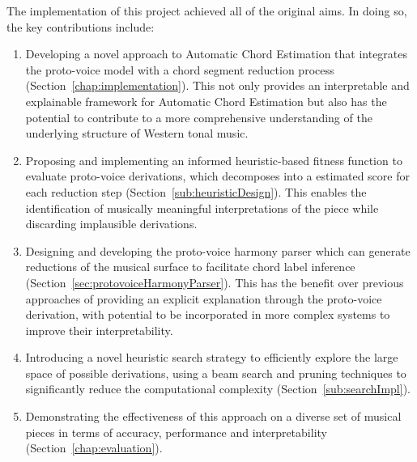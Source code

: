 \documentclass[12pt,a4paper,twoside,openany]{report} \usepackage[pdfborder={0 0 0}]{hyperref}    %
\theoremstyle{definition} \newtheorem{definition}{Definition}[section]
\begin{document}
    The implementation of this project achieved all of the original aims. In doing so, the key contributions include:
    \begin{enumerate}
      \item Developing a novel approach to Automatic Chord Estimation that integrates the proto-voice model with
        a chord segment reduction process (Section~\ref{chap:implementation}). This not only provides an interpretable and explainable
        framework for Automatic Chord Estimation but also has the potential to contribute to a more comprehensive
        understanding of the underlying structure of Western tonal music. 
      \item Proposing and implementing an informed heuristic-based fitness function to evaluate proto-voice
        derivations, which decomposes into a estimated score for each reduction step (Section~\ref{sub:heuristicDesign}). This enables the identification of musically meaningful interpretations of the piece while discarding implausible derivations. 
      \item Designing and developing the proto-voice harmony parser which can generate reductions of the musical surface
        to facilitate chord label inference (Section~\ref{sec:protovoiceHarmonyParser}). 
        This has the benefit over previous approaches of providing an explicit explanation through the proto-voice derivation, with potential to be incorporated in more complex systems to improve their interpretability.
      \item Introducing a novel heuristic search strategy to efficiently explore the large space of possible derivations,
        using a beam search and pruning techniques to significantly reduce the computational complexity (Section~\ref{sub:searchImpl}). 
      \item Demonstrating the effectiveness of this approach on a diverse set of musical pieces in terms of
        accuracy, performance and interpretability (Section~\ref{chap:evaluation}). 
    \end{enumerate}
\end{document}
